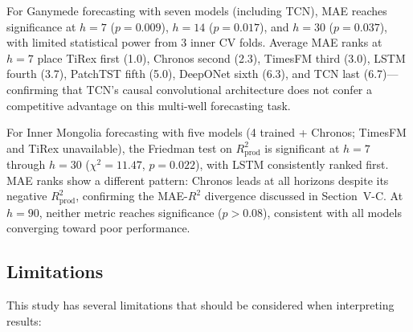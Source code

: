 \documentclass[conference]{IEEEtran}
\begin{document}
For Ganymede forecasting with seven models (including TCN), MAE reaches significance at $h{=}7$ ($p{=}0.009$), $h{=}14$ ($p{=}0.017$), and $h{=}30$ ($p{=}0.037$), with limited statistical power from 3 inner CV folds. Average MAE ranks at $h{=}7$ place TiRex first (1.0), Chronos second (2.3), TimesFM third (3.0), LSTM fourth (3.7), PatchTST fifth (5.0), DeepONet sixth (6.3), and TCN last (6.7)---confirming that TCN's causal convolutional architecture does not confer a competitive advantage on this multi-well forecasting task.

For Inner Mongolia forecasting with five models (4 trained + Chronos; TimesFM and TiRex unavailable), the Friedman test on $R^2_\text{prod}$ is significant at $h{=}7$ through $h{=}30$ ($\chi^2{=}11.47$, $p{=}0.022$), with LSTM consistently ranked first. MAE ranks show a different pattern: Chronos leads at all horizons despite its negative $R^2_\text{prod}$, confirming the MAE-$R^2$ divergence discussed in Section~V-C. At $h{=}90$, neither metric reaches significance ($p > 0.08$), consistent with all models converging toward poor performance.

\subsection{Limitations}

This study has several limitations that should be considered when interpreting results:
\end{document}
